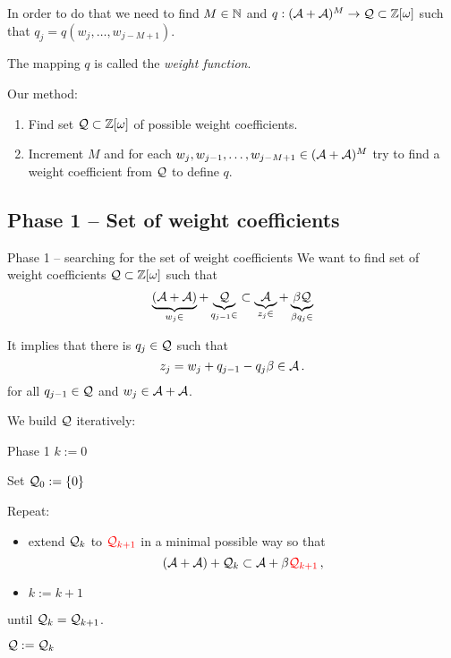     
    In order to do that we need to find $M \in \mathbb{N}$ and $q:(\mathcal{A}+\mathcal{A})^{M} \rightarrow \mathcal{Q} \subset \mathbb{Z}[\omega]$ such that $q_j=q(w_j, \dots, w_{j-M+1})$.
    
    The mapping $q$ is called the \textit{weight function}.%
    
    
    \vspace{20pt}
    Our method:
    \begin{enumerate}
        \item Find set $\mathcal{Q} \subset \mathbb{Z}[\omega]$ of possible weight coefficients.
        \item Increment $M$ and for each $w_j,w_{j-1}, \dots , w_{j-M+1} \in (\mathcal{A}+\mathcal{A})^{M}$ try to find a weight coefficient from $\mathcal{Q}$ to define $q$.
    \end{enumerate}


\subsection{Phase 1 -- Set of weight coefficients}

    {Phase 1 -- searching for the set of weight coefficients}
    We want to find set of weight coefficients $\mathcal{Q} \subset \mathbb{Z}[\omega]$ such that
    $$
    \underbrace{(\mathcal{A}+\mathcal{A})}_{w_j \in}+ \underbrace{\mathcal{Q}}_{q_{j-1} \in} \subset \underbrace{\mathcal{A}}_{z_j \in} + \underbrace{\beta \mathcal{Q}}_{\beta q_j \in}
    $$
    
    It implies that there is $q_j \in \mathcal{Q}$ such that
    $$
    z_j=w_j + q_{j-1} - q_j \beta \in \mathcal{A} \,.
    $$
    for all $q_{j-1} \in \mathcal{Q}$ and $w_j \in \mathcal{A}+\mathcal{A}$.




    We build $\mathcal{Q}$ iteratively:
    
    
    {Phase 1}
     $k:=0$
     
      Set $\mathcal{Q}_0:=\{0\}$
      
      
      Repeat:
      \begin{itemize}
          \item extend $\mathcal{Q}_k$ to $\textcolor{red}{\mathcal{Q}_{k+1}}$ in a minimal possible way so that
           $$
              (\mathcal{A}+\mathcal{A})+ \mathcal{Q}_k \subset \mathcal{A} + \beta \textcolor{red}{\mathcal{Q}_{k+1}}\,,
           $$
           \item $k:=k+1$
      \end{itemize}
      
      until $\mathcal{Q}_k = \mathcal{Q}_{k+1}$.
      
      
      \vspace{7pt}
      $\mathcal{Q}:=\mathcal{Q}_k$
    





